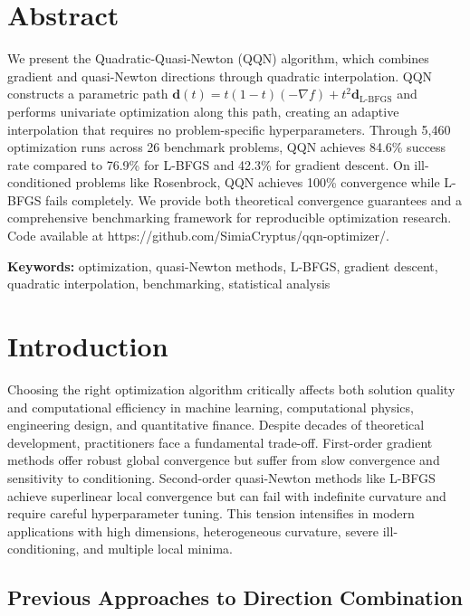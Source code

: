 \hypertarget{abstract}{%
\section{Abstract}\label{abstract}}

We present the Quadratic-Quasi-Newton (QQN) algorithm, which combines gradient and quasi-Newton directions through quadratic interpolation. QQN constructs a parametric path \(\mathbf{d}(t) = t(1-t)(-\nabla f) + t^2 \mathbf{d}_{\text{L-BFGS}}\) and performs univariate optimization along this path, creating an adaptive interpolation that requires no problem-specific hyperparameters. Through 5,460 optimization runs across 26 benchmark problems, QQN achieves 84.6\% success rate compared to 76.9\% for L-BFGS and 42.3\% for gradient descent. On ill-conditioned problems like Rosenbrock, QQN achieves 100\% convergence while L-BFGS fails completely. We provide both theoretical convergence guarantees and a comprehensive benchmarking framework for reproducible optimization research. Code available at https://github.com/SimiaCryptus/qqn-optimizer/.

\textbf{Keywords:} optimization, quasi-Newton methods, L-BFGS, gradient descent, quadratic interpolation, benchmarking, statistical analysis

\hypertarget{introduction}{%
\section{Introduction}\label{introduction}}

Choosing the right optimization algorithm critically affects both solution quality and computational efficiency in machine learning, computational physics, engineering design, and quantitative finance.
Despite decades of theoretical development, practitioners face a fundamental trade-off.
First-order gradient methods offer robust global convergence but suffer from slow convergence and sensitivity to conditioning.
Second-order quasi-Newton methods like L-BFGS achieve superlinear local convergence but can fail with indefinite curvature and require careful hyperparameter tuning.
This tension intensifies in modern applications with high dimensions, heterogeneous curvature, severe ill-conditioning, and multiple local minima.

\hypertarget{previous-approaches-to-direction-combination}{%
\subsection{Previous Approaches to Direction Combination}\label{previous-approaches-to-direction-combination}}

